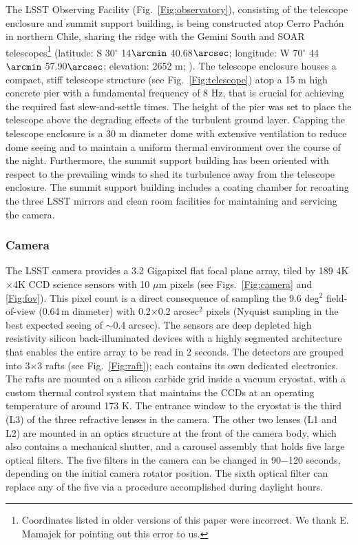 The LSST Observing Facility (Fig.~\ref{Fig:observatory}),
consisting of the telescope enclosure and summit support building, is being constructed atop Cerro Pach\'{o}n in northern Chile,
sharing the ridge with the Gemini South and SOAR telescopes\footnote{Coordinates listed in older versions
of this paper were incorrect. We thank E. Mamajek for pointing out this error to us.}
(latitude: S 30$^\circ$ 14$\arcmin$ 40.68$\arcsec$; longitude: W 70$^\circ$ 44$\arcmin$ 57.90$\arcsec$; elevation: 2652 m;
\citealt{2012arXiv1210.1616M}).  The telescope enclosure houses a compact, stiff
telescope structure (see Fig.~\ref{Fig:telescope}) atop a 15 m high concrete pier
with a fundamental frequency of 8 Hz, that is crucial for achieving the required fast slew-and-settle times.  The height of the pier was set to place the telescope above the degrading
effects of the turbulent ground layer.  Capping the telescope
enclosure is a 30 m diameter dome with extensive ventilation to reduce
dome seeing
and to maintain a uniform thermal environment over the course of the night.  Furthermore, the summit support
building has been oriented with respect to the prevailing winds to shed its turbulence away from the
telescope enclosure.  The summit support building includes a coating chamber for recoating the three LSST mirrors and
clean room facilities for maintaining and servicing the camera.


\subsubsection{ Camera }


The LSST camera provides a 3.2 Gigapixel flat focal plane array, tiled by 189
4K$\times$4K CCD science sensors with 10 $\mu$m pixels (see Figs.~\ref{Fig:camera}
and \ref{Fig:fov}). This pixel count is a direct consequence of sampling the
9.6 deg$^2$ field-of-view (0.64\,m diameter) with 0.2$\times$0.2 arcsec$^2$
pixels (Nyquist sampling in the best expected seeing of $\sim$0.4 arcsec).
The sensors are deep depleted high resistivity silicon back-illuminated devices with
a highly segmented architecture that enables the entire array to be read in 2 seconds.
The detectors are grouped into 3$\times$3 rafts (see Fig.~\ref{Fig:raft}); each
contains its own dedicated electronics. The rafts are mounted on a silicon carbide
grid inside a vacuum cryostat, with a custom thermal control system that maintains
the CCDs at an operating temperature of around 173 K. The entrance window to the
cryostat is the third (L3) of the three refractive lenses in the camera. The other
two lenses (L1 and L2) are mounted in an optics structure at the front of the camera
body, which also contains a mechanical shutter, and a carousel assembly that holds
five large optical filters. The five filters in the camera can be changed in 90$-$120 seconds, 
depending on the initial camera rotator position. The sixth optical filter can
replace any of the five via a procedure accomplished during daylight hours.

